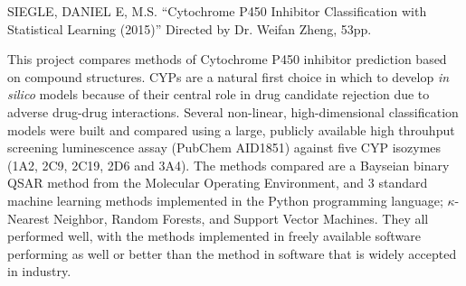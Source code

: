 SIEGLE, DANIEL E, M.S.
``Cytochrome P450 Inhibitor Classification with Statistical Learning (2015)'' Directed by Dr. Weifan Zheng, 53pp.
\vspace{1cm}


This project compares methods of Cytochrome P450 inhibitor prediction based on compound structures. CYPs are a natural first choice in which to  develop \textit{in silico} models because of their central role in drug candidate rejection due to adverse drug-drug interactions. Several non-linear, high-dimensional classification models were built and compared using a large, publicly available high throuhput screening luminescence assay (PubChem AID1851) against five CYP isozymes (1A2, 2C9, 2C19, 2D6 and 3A4). The methods compared are a Bayseian binary QSAR method from the Molecular Operating Environment, and 3 standard machine learning methods implemented in the Python programming language; $\kappa$-Nearest Neighbor, Random Forests, and Support Vector Machines. They all performed well, with the methods implemented in freely available software performing as well or better than the method in software that is widely accepted in industry. 